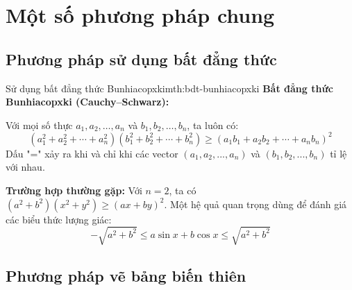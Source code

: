 \chapter{Một số phương pháp chung}
\label{ch:methods}

\section{Phương pháp sử dụng bất đẳng thức}

\begin{lythuyetbox}{Sử dụng bất đẳng thức Bunhiacopxki}{mth:bdt-bunhiacopxki}
    \textbf{Bất đẳng thức Bunhiacopxki (Cauchy–Schwarz):}
    
    Với mọi số thực $a_1, a_2, \ldots, a_n$ và $b_1, b_2, \ldots, b_n$, ta luôn có:
    \[
    (a_1^2 + a_2^2 + \cdots + a_n^2)(b_1^2 + b_2^2 + \cdots + b_n^2) \geq (a_1b_1 + a_2b_2 + \cdots + a_nb_n)^2
    \]
    Dấu "=" xảy ra khi và chỉ khi các vector $(a_1, a_2, ..., a_n)$ và $(b_1, b_2, ..., b_n)$ tỉ lệ với nhau.

    \textbf{Trường hợp thường gặp:}
    Với $n=2$, ta có $(a^2+b^2)(x^2+y^2) \geq (ax+by)^2$.
    Một hệ quả quan trọng dùng để đánh giá các biểu thức lượng giác:
    \[
    -\sqrt{a^2+b^2} \leq a\sin x + b\cos x \leq \sqrt{a^2+b^2}
    \]
\end{lythuyetbox}

\section{Phương pháp vẽ bảng biến thiên}

